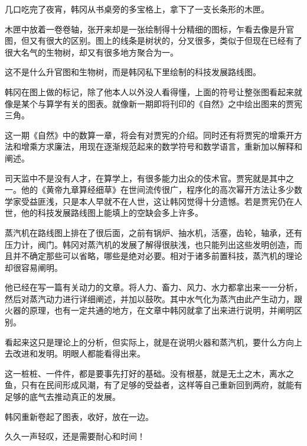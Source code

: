 几口吃完了夜宵，韩冈从书桌旁的多宝格上，拿下了一支长条形的木匣。

木匣中放着一卷卷轴，张开来却是一张绘制得十分精细的图标，乍看去像是升官图，但又有很大的区别。图上的线条是树状的，分叉很多，类似于但现在已经有了很大名气的生物树，却又有很多地方聚合为一。

这不是什么升官图和生物树，而是韩冈私下里绘制的科技发展路线图。

韩冈在图上做的标记，除了他本人以外没人看得懂，上面的符号让整张图看起来就像是某个与算学有关的图表。就像新一期即将刊印的《自然》之中绘出图来的贾宪三角。

这一期《自然》中的数算一章，将会有对贾宪的介绍。同时还有将贾宪的增乘开方法和增乘方求廉法，用现在逐渐规范起来的数学符号和数学语言，重新加以解释和阐述。

司天监中不是没有人才，在算学上，有很多能力出众的伎术官。贾宪就是其中之一。他的《黄帝九章算经细草》在世间流传很广，程序化的高次幂开方法让多少数学家受益匪浅，只是本人早就不在人世，这让韩冈觉得十分遗憾。若是贾宪仍在人世，他的科技发展路线图上能填上的空缺会多上许多。

蒸汽机在路线图上排在了很后面，之前有锅炉、抽水机，活塞，齿轮，轴承，还有压力计，阀门。韩冈对蒸汽机的发展了解得很肤浅，也只能列出这些发明创造，而且并不确定那些可以省略，哪些是绝对必要。相对于诸多前置科技，蒸汽机的理论却很容易阐明。

他已经在写一篇有关动力的文章。将人力、畜力、风力、水力都拿出来一一分析，然后对蒸汽动力进行详细阐述，并加以鼓吹。其中水气化为蒸汽由此产生动力，跟火器的原理，也有一定共通的地方，在文章中韩冈就拿了出来进行说明，并阐明区别。

看起来这只是理论上的分析，但实际上，就是在说明火器和蒸汽机，要什么方向上去改进和发明。明眼人都能看得出来。

这一桩桩、一件件，都是要事先打好的基础。没有根基，就是无土之木，离水之鱼，只有在民间形成风潮，有了足够的受益者，这样等自己重新回到两府，就能有足够的底气去推动真正的发展。

韩冈重新卷起了图表，收好，放在一边。

久久一声轻叹，还是需要耐心和时间！

